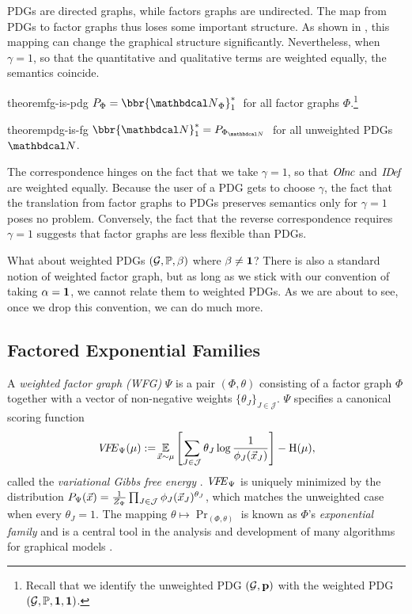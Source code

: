 PDGs are directed graphs, while factors graphs are undirected. The
map from PDGs to factor graphs thus loses some important structure.
As shown in , this mapping can change the graphical structure significantly.
Nevertheless, when $\gamma = 1$, so that the quantitative and qualitative terms are weighted equally, the semantics coincide. 


\begin{linked}{theorem}{fg-is-pdg}
$\Pr_{\Phi} = \bbr{\UPDGof{\Phi}}_{1}^*\;$ for all factor graphs
$\Phi$.\footnote{Recall that we identify the unweighted PDG $(\Gr,\mat
p)$ with the weighted PDG $(\Gr,\mathbb P,  \mat 1, \mat 1)$.}  
\end{linked}
\begin{linked}{theorem}{pdg-is-fg}
$\bbr{\dg N}_{1}^* = \Pr_{\FGof{\dg N}}\;$ for all unweighted
	PDGs $\dg N$.  
\end{linked}
The correspondence hinges on the fact that we take $\gamma=1$, so that $\OInc$ and
$\IDef_{}$ are weighted equally.
Because the user of a PDG gets to choose $\gamma$, the fact that the 
translation from factor graphs to PDGs preserves semantics only for $\gamma=1$
poses no problem.
Conversely, the fact that the reverse correspondence requires
$\gamma=1$ suggests 
that factor graphs are less flexible than PDGs.

What about weighted PDGs $(\Gr, \mathbb P, \beta)$ where $\beta \ne {\bf 1}$?
There is also a standard notion of weighted factor graph,
but as long as we stick with our convention of taking  $\alpha = {\bf 1}$, 
we cannot relate them to weighted PDGs.  
As we are about to see,
once we drop this convention, we can do much more.


\subsection{Factored Exponential Families}\label{sec:expfam}

A \emph{weighted factor graph (WFG)} $\Psi$ is a pair
$(\Phi,\theta)$ consisting of a factor graph $\Phi$ 
together with a vector of non-negative weights
$\{ \theta_J \}_{J \in \mathcal J}$.
$\Psi$ specifies a canonical scoring function 
\begin{equation}
\VFE_{\Psi}(\mu)
	 := \!\Ex_{\vec x\sim\mu}\left[  \sum_{J \in
           \cal J} \theta_J \log\frac1{\phi_J(\vec
               x_J)}\right] - \H(\mu)  , 
			   \label{eqn:free-energy}
\end{equation}
called the \emph{variational
Gibbs free energy} \cite{mezard2009information}. 
$\VFE_{\Psi}$ is uniquely minimized by the distribution
${\Pr}_{\Psi}(\vec x) = \frac{1}{Z_{\Psi}}
 	\prod_{J \in \cal J} \phi_J(\vec x_J)^{\theta_J}$, 
which matches the unweighted case when every $\theta_J = 1$.
The mapping $\theta \mapsto \Pr_{(\Phi,\theta)}$ is known as 
$\Phi$'s \emph{exponential family} and is a central tool in the analysis  
and development of many algorithms for graphical models \cite{wainwright2008graphical}.

